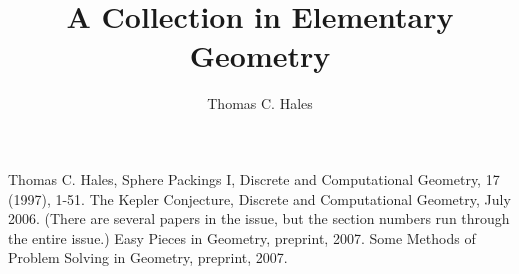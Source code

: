 \documentclass[11pt]{amsart}
\title{A Collection in Elementary Geometry}
\author{Thomas C. Hales}
\def\svninfo{SVN:511, 9/12/2008}
\begin{document}
\maketitle

\symbolfootnote[0]{\svninfo}

\def\pdffigtemplate#1#2#3{%
\begin{figure}[htb]%
  \centering
  \myincludegraphics{\pdf/#1}
  \caption{#3}
  \label{tarski:fig:#2}%
\end{figure}%
}
\def\usegraphics{
\def\pdf{/Users/thomashales/Pictures/collect_geom}
\def\pdffig{\pdffigtemplate}
}
\def\pdffig#1#2#3{}
\def\myincludegraphics#1{\texttt{[image: noimage.eps]}}
 








\newpage
\begin{thebibliography}{CHMS94}
 Thomas C. Hales, Sphere Packings I,
    Discrete and Computational Geometry, 17 (1997), 1-51.
 The Kepler Conjecture, Discrete and
Computational Geometry, July 2006. (There are several papers in
the issue, but the section numbers run through the entire issue.)
 Easy Pieces in Geometry, preprint, 2007.
 Some Methods of Problem
Solving in Geometry, preprint, 2007.
\end{thebibliography}

{


}

\tableofcontents
\end{document}
